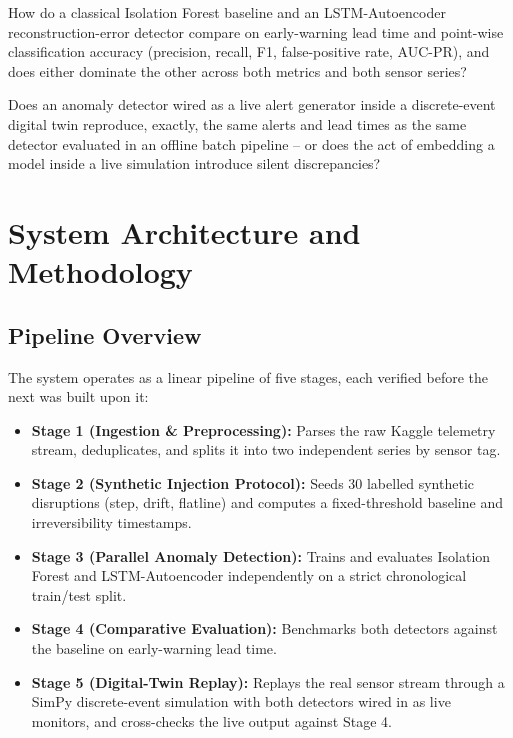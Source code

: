 \documentclass[11pt,a4paper,oneside]{report}
\begin{document}
\begin{researchquestion}
How do a classical Isolation Forest baseline and an LSTM-Autoencoder reconstruction-error detector compare on early-warning lead time and point-wise classification accuracy (precision, recall, F1, false-positive rate, AUC-PR), and does either dominate the other across both metrics and both sensor series?
\end{researchquestion}

\begin{researchquestion}
Does an anomaly detector wired as a live alert generator inside a discrete-event digital twin reproduce, exactly, the same alerts and lead times as the same detector evaluated in an offline batch pipeline -- or does the act of embedding a model inside a live simulation introduce silent discrepancies?
\end{researchquestion}

\chapter[System Architecture \& Methodology]{System Architecture and Methodology}
\label{chap:methodology}

\section{Pipeline Overview}
\label{sec:pipeline_overview}

The system operates as a linear pipeline of five stages, each verified before the next was built upon it:

\begin{itemize}[leftmargin=*,itemsep=2pt]
    \item \textbf{Stage 1 (Ingestion \& Preprocessing):} Parses the raw Kaggle telemetry stream, deduplicates, and splits it into two independent series by sensor tag.
    \item \textbf{Stage 2 (Synthetic Injection Protocol):} Seeds 30 labelled synthetic disruptions (step, drift, flatline) and computes a fixed-threshold baseline and irreversibility timestamps.
    \item \textbf{Stage 3 (Parallel Anomaly Detection):} Trains and evaluates Isolation Forest and LSTM-Autoencoder independently on a strict chronological train/test split.
    \item \textbf{Stage 4 (Comparative Evaluation):} Benchmarks both detectors against the baseline on early-warning lead time.
    \item \textbf{Stage 5 (Digital-Twin Replay):} Replays the real sensor stream through a SimPy discrete-event simulation with both detectors wired in as live monitors, and cross-checks the live output against Stage 4.
\end{itemize}
\end{document}
